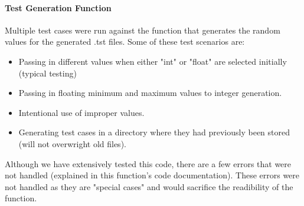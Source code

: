 \paragraph{Test Generation Function}
Multiple test cases were run against the function that generates the random values for the generated .tst files. Some of these test scenarios are:
\begin{itemize}
    \item Passing in different values when either "int" or "float" are selected initially (typical testing)
    \item Passing in floating minimum and maximum values to integer generation. 
    \item Intentional use of improper values.
    \item Generating test cases in a directory where they had previously been stored (will not overwright old files).
\end{itemize}

Although we have extensively tested this code, there are a few errors that were not handled (explained in this function's code documentation). These errors were not handled as they are "special cases" and would sacrifice the readibility of the function. 

